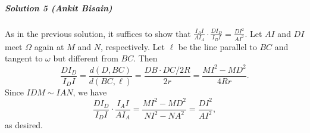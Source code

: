 \documentclass[11pt]{scrartcl}
\begin{document}
\subparagraph{Solution 5 (Ankit Bisain)}

As in the previous solution, it suffices to show that $\frac{I_AI}{AI_A}\cdot
\frac{DI_D}{I_DI} = \frac{DI^2}{AI^2}$. Let $AI$ and $DI$ meet $\Omega$ again at
$M$ and $N$, respectively. Let $\ell$ be the line parallel to $BC$ and tangent
to $\omega$ but different from $BC$. Then
\[
  \frac{DI_D}{I_DI}=\frac{d(D, BC)}{d(BC, \ell)} = \frac{DB\cdot DC/2R}{2r} =
  \frac{MI^2-MD^2}{4Rr}.
\]
Since $IDM\sim IAN$, we have
\[\frac{DI_D}{I_DI}\cdot \frac{I_AI}{AI_A} =
\frac{MI^2-MD^2}{NI^2-NA^2}=\frac{DI^2}{AI^2},\]
as desired.

%
%
\end{document}
